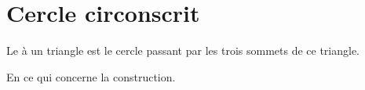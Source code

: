 \section{Cercle circonscrit}

\begin{definition}
    Le  à un triangle est le cercle passant par les trois sommets de ce triangle.
\end{definition}


\begin{center}
   
\end{center}

En ce qui concerne la construction.

\begin{center}
   
\end{center}


